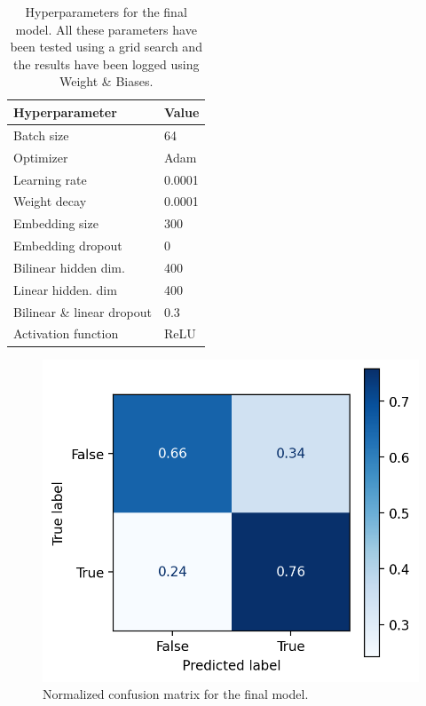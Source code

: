 \documentclass[11pt,a4paper]{article}
\begin{document}
	\begin{table}[H]
		\centering
		\begin{tabular}{@{}ll@{}}
			\toprule
			\textbf{Hyperparameter}  & \textbf{Value} \\ \midrule
			Batch size               & 64             \\
			Optimizer                & Adam           \\
			Learning rate            & 0.0001         \\
			Weight decay             & 0.0001         \\
			Embedding size           & 300            \\
			Embedding dropout        & 0              \\
			Bilinear hidden dim.     & 400            \\
			Linear hidden. dim       & 400            \\
			Bilinear \& linear dropout & 0.3            \\
			Activation function      & ReLU           \\ \bottomrule
		\end{tabular}
		\caption{Hyperparameters for the final model. All these parameters have been tested using a grid search and the results have been logged using Weight \& Biases.}
		\label{tab:hyperparameters}
	\end{table}
	
	\begin{figure}[H]
		\centering
		\includegraphics[width=1\columnwidth]{confusion_matrix.png}
		\caption{Normalized confusion matrix for the final model.}
		\label{fig:confusionmatrix}
	\end{figure}
\end{document}
